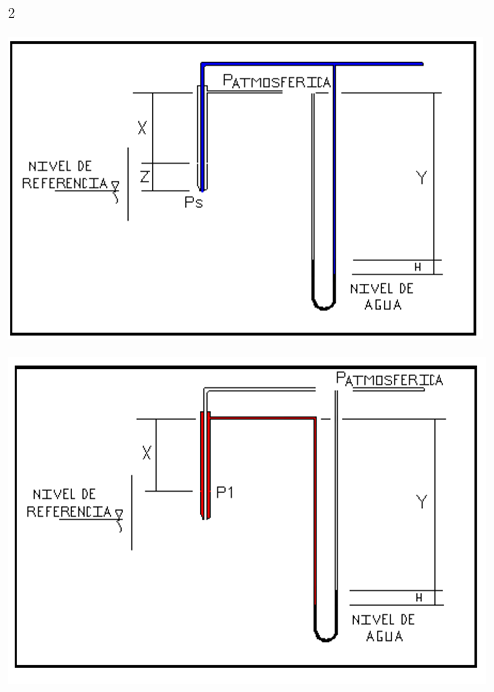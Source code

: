 \documentclass[12pt,spanish,Letterpaper,openany]{book}
\begin{document}
\begin {multicols}{2}
\begin {flushleft}
\begin{minipage}[c]{\columnwidth}
\end{minipage}

\end {flushleft}

\begin {flushleft}
\noindent\begin{minipage}[c]{\columnwidth}

\centering

\includegraphics[width=1\linewidth]{images/image07_wvaliente}

\end{minipage}

\end {flushleft}

\begin {flushleft}
\noindent\begin{minipage}[c]{\columnwidth}
\centering

\includegraphics[width=1\linewidth]{images/image08_wvaliente}


\end{minipage}
\end{flushleft}
\end{multicols}
\end{document}
